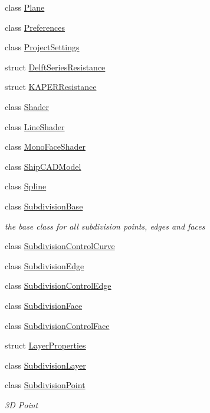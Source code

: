 \begin{DoxyCompactItemize}
class \hyperlink{classShipCAD_1_1Plane}{Plane}
\item 
class \hyperlink{classShipCAD_1_1Preferences}{Preferences}
\item 
class \hyperlink{classShipCAD_1_1ProjectSettings}{Project\-Settings}
\item 
struct \hyperlink{structShipCAD_1_1DelftSeriesResistance}{Delft\-Series\-Resistance}
\item 
struct \hyperlink{structShipCAD_1_1KAPERResistance}{K\-A\-P\-E\-R\-Resistance}
\item 
class \hyperlink{classShipCAD_1_1Shader}{Shader}
\item 
class \hyperlink{classShipCAD_1_1LineShader}{Line\-Shader}
\item 
class \hyperlink{classShipCAD_1_1MonoFaceShader}{Mono\-Face\-Shader}
\item 
class \hyperlink{classShipCAD_1_1ShipCADModel}{Ship\-C\-A\-D\-Model}
\item 
class \hyperlink{classShipCAD_1_1Spline}{Spline}
\item 
class \hyperlink{classShipCAD_1_1SubdivisionBase}{Subdivision\-Base}
\begin{DoxyCompactList}\small\item\em the base class for all subdivision points, edges and faces \end{DoxyCompactList}\item 
class \hyperlink{classShipCAD_1_1SubdivisionControlCurve}{Subdivision\-Control\-Curve}
\item 
class \hyperlink{classShipCAD_1_1SubdivisionEdge}{Subdivision\-Edge}
\item 
class \hyperlink{classShipCAD_1_1SubdivisionControlEdge}{Subdivision\-Control\-Edge}
\item 
class \hyperlink{classShipCAD_1_1SubdivisionFace}{Subdivision\-Face}
\item 
class \hyperlink{classShipCAD_1_1SubdivisionControlFace}{Subdivision\-Control\-Face}
\item 
struct \hyperlink{structShipCAD_1_1LayerProperties}{Layer\-Properties}
\item 
class \hyperlink{classShipCAD_1_1SubdivisionLayer}{Subdivision\-Layer}
\item 
class \hyperlink{classShipCAD_1_1SubdivisionPoint}{Subdivision\-Point}
\begin{DoxyCompactList}\small\item\em 3\-D Point \end{DoxyCompactList}\item 

\end{DoxyCompactItemize}
